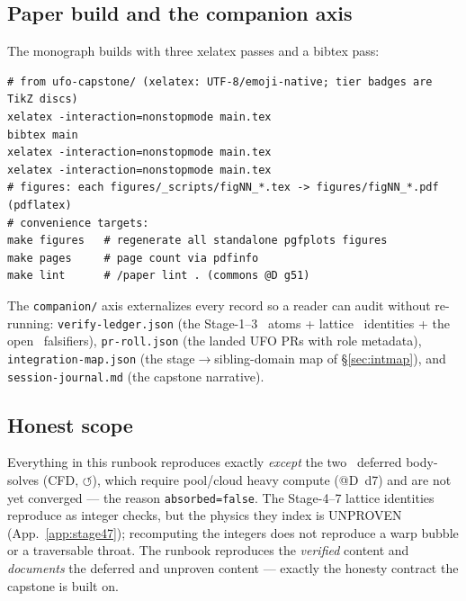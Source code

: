 \subsection{Paper build and the companion axis}
\label{app:repro-build}

The monograph builds with three xelatex passes and a bibtex pass:

\begin{lstlisting}
# from ufo-capstone/ (xelatex: UTF-8/emoji-native; tier badges are TikZ discs)
xelatex -interaction=nonstopmode main.tex
bibtex main
xelatex -interaction=nonstopmode main.tex
xelatex -interaction=nonstopmode main.tex
# figures: each figures/_scripts/figNN_*.tex -> figures/figNN_*.pdf (pdflatex)
# convenience targets:
make figures   # regenerate all standalone pgfplots figures
make pages     # page count via pdfinfo
make lint      # /paper lint . (commons @D g51)
\end{lstlisting}

The \texttt{companion/} axis externalizes every record so a reader can
audit without re-running: \texttt{verify-ledger.json} (the Stage-1--3
\tierGreen\ atoms + lattice \tierBlue\ identities + the open \tierWhite\
falsifiers), \texttt{pr-roll.json} (the landed UFO PRs with role
metadata), \texttt{integration-map.json} (the stage$\to$sibling-domain
map of \S\ref{sec:intmap}), and \texttt{session-journal.md} (the capstone
narrative).

\subsection{Honest scope}
\label{app:repro-scope}

Everything in this runbook reproduces exactly \emph{except} the two
\tierOrange\ deferred body-solves (CFD, $\circlearrowleft$), which require
pool/cloud heavy compute (@D~d7) and are not yet converged --- the reason
\texttt{absorbed=false}. The Stage-4--7 lattice identities reproduce as
integer checks, but the physics they index is UNPROVEN
(App.~\ref{app:stage47}); recomputing the integers does not reproduce a
warp bubble or a traversable throat. The runbook reproduces the
\emph{verified} content and \emph{documents} the deferred and unproven
content --- exactly the honesty contract the capstone is built on.
